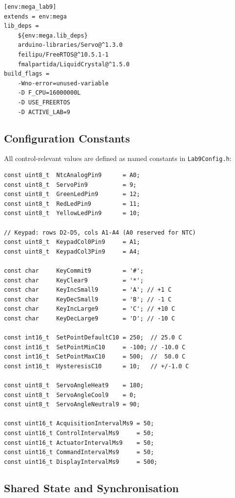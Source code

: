 \documentclass[12pt]{article}
\begin{document}
\begin{lstlisting}
[env:mega_lab9]
extends = env:mega
lib_deps =
    ${env:mega.lib_deps}
    arduino-libraries/Servo@^1.3.0
    feilipu/FreeRTOS@^10.5.1-1
    fmalpartida/LiquidCrystal@^1.5.0
build_flags =
    -Wno-error=unused-variable
    -D F_CPU=16000000L
    -D USE_FREERTOS
    -D ACTIVE_LAB=9
\end{lstlisting}

\subsection{Configuration Constants}

All control-relevant values are defined as named constants in \texttt{Lab9Config.h}:

\begin{lstlisting}[caption={Lab9Config.h --- key constants}]
const uint8_t  NtcAnalogPin9      = A0;
const uint8_t  ServoPin9          = 9;
const uint8_t  GreenLedPin9       = 12;
const uint8_t  RedLedPin9         = 11;
const uint8_t  YellowLedPin9      = 10;

// Keypad: rows D2-D5, cols A1-A4 (A0 reserved for NTC)
const uint8_t  KeypadCol0Pin9     = A1;
const uint8_t  KeypadCol3Pin9     = A4;

const char     KeyCommit9         = '#';
const char     KeyClear9          = '*';
const char     KeyIncSmall9       = 'A'; // +1 C
const char     KeyDecSmall9       = 'B'; // -1 C
const char     KeyIncLarge9       = 'C'; // +10 C
const char     KeyDecLarge9       = 'D'; // -10 C

const int16_t  SetPointDefaultC10 = 250;  // 25.0 C
const int16_t  SetPointMinC10     = -100; // -10.0 C
const int16_t  SetPointMaxC10     = 500;  //  50.0 C
const int16_t  HysteresisC10      = 10;   // +/-1.0 C

const uint8_t  ServoAngleHeat9    = 180;
const uint8_t  ServoAngleCool9    = 0;
const uint8_t  ServoAngleNeutral9 = 90;

const uint16_t AcquisitionIntervalMs9 = 50;
const uint16_t ControlIntervalMs9     = 50;
const uint16_t ActuatorIntervalMs9    = 50;
const uint16_t CommandIntervalMs9     = 50;
const uint16_t DisplayIntervalMs9     = 500;
\end{lstlisting}

\subsection{Shared State and Synchronisation}
\end{document}

